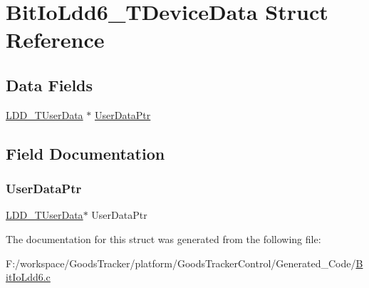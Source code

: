 \hypertarget{struct_bit_io_ldd6___t_device_data}{}\section{Bit\+Io\+Ldd6\+\_\+\+T\+Device\+Data Struct Reference}
\label{struct_bit_io_ldd6___t_device_data}
\subsection*{Data Fields}
\begin{DoxyCompactItemize}
\item 
\hyperlink{group___p_e___types__module_ga0b66a73f87238a782318aa0be7578e35}{L\+D\+D\+\_\+\+T\+User\+Data} $\ast$ \hyperlink{struct_bit_io_ldd6___t_device_data_a8e77b9d030b00c231823350a904e0f83}{User\+Data\+Ptr}
\end{DoxyCompactItemize}


\subsection{Field Documentation}
\mbox{\label{struct_bit_io_ldd6___t_device_data_a8e77b9d030b00c231823350a904e0f83}} 
\subsubsection{\texorpdfstring{User\+Data\+Ptr}{UserDataPtr}}
{\footnotesize\ttfamily \hyperlink{group___p_e___types__module_ga0b66a73f87238a782318aa0be7578e35}{L\+D\+D\+\_\+\+T\+User\+Data}$\ast$ User\+Data\+Ptr}



The documentation for this struct was generated from the following file\+:\begin{DoxyCompactItemize}
\item 
F\+:/workspace/\+Goods\+Tracker/platform/\+Goods\+Tracker\+Control/\+Generated\+\_\+\+Code/\hyperlink{_bit_io_ldd6_8c}{Bit\+Io\+Ldd6.\+c}\end{DoxyCompactItemize}
